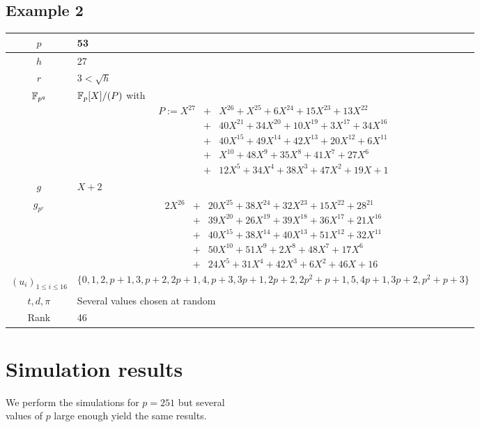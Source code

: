 \documentclass[a4paper]{article}
\newcommand{\GF}[1]{\F_{#1}}
\begin{document}
\newpage
\subsection{Example 2}
\label{Ex:2}



\begin{center}
\begin{tabularx}{\textwidth}{|c|X|} \hline
$p$ & 53  \\ \hline
$h$ & 27  \\ \hline
$r$ & $3 < \sqrt{h}$  \\ \hline
$\GF{p^q}$ & $\GF{p}[X] / (P)$ with
\begin{eqnarray*}
P := X^{27} &+& X^{26} + X^{25} + 6X^{24} + 15X^{23} + 13X^{22} \\
&+& 40X^{21} + 34X^{20} + 10X^{19} + 3X^{17} + 34X^{16}\\
&+& 40X^{15} + 49X^{14} + 42X^{13} + 20X^{12} + 6X^{11} \\
&+& X^{10} + 48X^9 + 35X^8 + 41X^7 + 27X^6 \\
&+& 12X^5 + 34X^4 + 38X^3 + 47X^2 + 19X + 1
\end{eqnarray*} \\ \hline
$g$ & $X+2$ \\ \hline
$g_{p^r}$ &  \begin{eqnarray*}
2X^{26} &+& 20X^{25} + 38X^{24} + 32X^{23} + 15X^{22} + 28^{21} \\
&+& 39X^{20} + 26X^{19} + 39X^{18} + 36X^{17} + 21X^{16}\\
&+& 40X^{15} + 38X^{14} + 40X^{13} + 51X^{12} + 32X^{11} \\
&+& 50X^{10} + 51X^9 + 2X^8 + 48X^7 + 17X^6 \\
&+& 24X^5 + 31X^4 + 42X^3 + 6X^2 + 46X + 16
\end{eqnarray*} \\ \hline
$(u_i)_{1 \leq i \leq 16}$ & $$\{ 0,1,2,p+1,3,p+2,2p+1,4,p+3,3p+1,2p+2,2p^2+p+1,5,4p+1,3p+2,p^2+p+3 \} $$ \\ \hline
$t, d, \pi$ & Several values chosen at random \\ \hline
Rank & 46 \\ \hline
\end{tabularx}
\end{center}



\section{Simulation results}
\label{Sim:res}

We perform the simulations for $p = 251$ but several\\
values of $p$ large enough yield the same results.
\begin{minipage}[H]{30cm}

\end{minipage}
\end{document}
